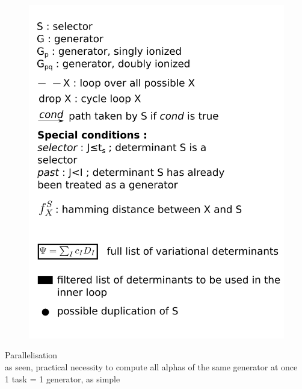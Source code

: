 \documentclass[./thesis.tex]{subfiles}
\begin{document}
\begin{figure}[ph!]
	\begin{center}
		\includegraphics[width=1.00\columnwidth]{figures/cipsi/selection_key}
		\caption{\label{fig:selection_key}}
	\end{center}
\end{figure}
    
Parallelisation \\
as seen, practical necessity to compute all alphas of the same generator at once \\
1 task = 1 generator, as simple \\
\end{document}
